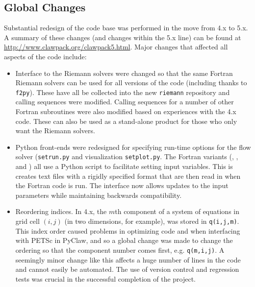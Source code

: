 %
%
%

\subsection{Global Changes}
Substantial redesign of the \clawpack code base was performed in the move
from \clawpack 4.x to 5.x.  A summary of these changes (and changes within
the 5.x line) can be found at \url{http://www.clawpack.org/clawpack5.html}.
Major changes that affected all aspects of the code include:
\begin{itemize}
    \item Interface to the Riemann solvers were changed so that the same Fortran
Riemann solvers can be used for all versions of the code (including \pyclaw
thanks to \texttt{f2py}).  These have all be collected into the new
\texttt{riemann} repository and calling sequences were modified.  Calling
sequences for a number of other Fortran subroutines were also modified based
on experiences with the \clawpack 4.x code.  These can also be used as a 
stand-alone product for those who only want the Riemann solvers.
    \item Python front-ends were redesigned for specifying run-time options for the flow solver (\texttt{setrun.py} and visualization \texttt{setplot.py}.  The Fortran variants
(\classic, \amrclaw, and \geoclaw) all use a Python script to facilitate
setting input variables.  This is creates text files with a rigidly specified format that are
then read in when the Fortran code is run.  The interface now allows updates to the input parameters while maintaining backwards compatibility.
    \item Reordering indices.  In \clawpack 4.x, the $m$th component of a
system of equations in grid cell $(i,j)$ (in two dimensions, for example),
was stored in \texttt{q(i,j,m)}.  This index order caused problems in
optimizing code and when interfacing with PETSc in PyClaw, and so a global
change was made to change the ordering so that the component number comes
first, e.g. \texttt{q(m,i,j)}.  A seemingly minor change like this affects a
huge number of lines in the code and cannot easily be automated. The use of
version control and regression tests was crucial in the successful
completion of the project.
\end{itemize}
